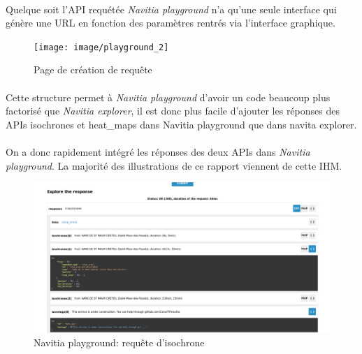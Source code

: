 \documentclass[a4paper]{report}
\begin{document}
\paragraph{} Quelque soit l'API requétée \emph{Navitia playground} n'a qu'une seule interface qui génère une URL en fonction des paramètres rentrés via l'interface graphique.

\begin{figure}[H]
	\begin{center}
		\texttt{[image: image/playground\_2]}
		\caption{Page de création de requête}
		\label{Page de création de requête}
	\end{center}
\end{figure}

\paragraph{} Cette structure permet à \emph{Navitia playground} d'avoir un code beaucoup plus factorisé que \emph{Navitia explorer}, il est donc plus facile d'ajouter les réponses des APIs isochrones et heat\_maps dans Navitia playground que dans navita explorer. 

\paragraph{} On a donc rapidement intégré les réponses des deux APIs dans \emph{Navitia playground}. La majorité des illustrations de ce rapport viennent de cette IHM.  

\begin{figure}[H]
	\begin{center}
		\includegraphics[width=400pt]{image/n_p_flux_json}
		\caption{Navitia playground: requête d'isochrone}
		\label{Navitia playground: requête d'isochrone}
	\end{center}
\end{figure}
\end{document}
